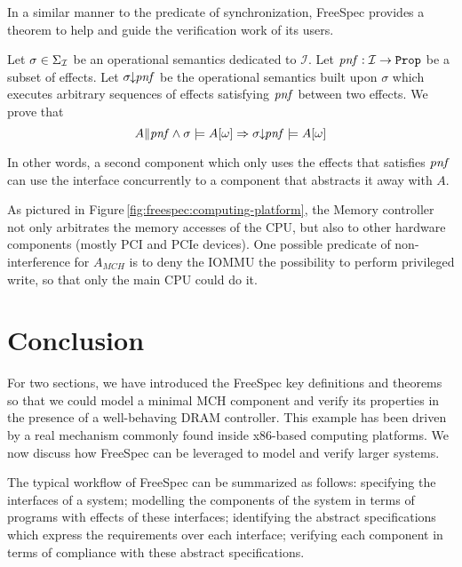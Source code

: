 In a similar manner to the predicate of synchronization, FreeSpec provides a
theorem to help and guide the verification work of its users.

\begin{theorem}
  Let $\sigma \in \Sigma_{\mathcal{I}}$ be an operational semantics dedicated to
  $\mathcal{I}$. Let $\mathit{pnf} : \mathcal{I} \rightarrow \texttt{Prop}$ be a subset
  of effects. Let $\sigma\!\!\downarrow\!\!\mathit{pnf}$ be the operational
  semantics built upon $\sigma$ which executes arbitrary sequences of
  effects satisfying $\mathit{pnf}$ between two effects.  We prove
  that
  \[ A \| \mathit{pnf} \wedge \sigma \models A[\omega] \Rightarrow
    \sigma\!\!\downarrow\!\!\mathit{pnf} \models A[\omega]
  \]
\end{theorem}

In other words, a second component which only uses the effects that satisfies
$\mathit{pnf}$ can use the interface concurrently to a component that abstracts it
away with $A$.

\begin{example}
  As pictured in Figure\,\ref{fig:freespec:computing-platform}, the Memory
  controller not only arbitrates the memory accesses of the CPU, but also to
  other hardware components (mostly PCI and PCIe devices).
  One possible predicate of non-interference for $A_{MCH}$ is to deny the IOMMU
  the possibility to perform privileged write, so that only the main CPU could
  do it.
\end{example}

\section{Conclusion}
\label{sec:freespec:scale}

For two sections, we have introduced the FreeSpec key definitions and theorems
so that we could model a minimal MCH component and verify its properties in the
presence of a well-behaving DRAM controller.
%
This example has been driven by a real mechanism commonly found inside x86-based
computing platforms.
%
We now discuss how FreeSpec can be leveraged to model and verify larger systems.

The typical workflow of FreeSpec can be summarized as follows: specifying the
interfaces of a system; modelling the components of the system in terms of
programs with effects of these interfaces; identifying the abstract
specifications which express the requirements over each interface; verifying
each component in terms of compliance with these abstract specifications.

